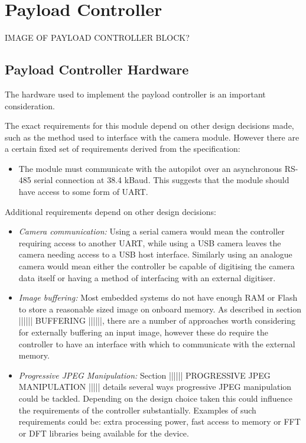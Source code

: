 \section{Payload Controller}
IMAGE OF PAYLOAD CONTROLLER BLOCK?

\subsection{Payload Controller Hardware}
The hardware used to implement the payload controller is an important consideration.

The exact requirements for this module depend on other design decisions made, such as the method used to interface with the camera module. However there are a certain fixed set of requirements derived from the specification:

\begin{itemize}
\item The module must communicate with the autopilot over an asynchronous RS-485 serial connection at 38.4 kBaud. This suggests that the module should have access to some form of UART.
\end{itemize}

Additional requirements depend on other design decisions:

\begin{itemize}
\item \emph{Camera communication:} Using a serial camera would mean the controller requiring access to another UART, while using a USB camera leaves the camera needing access to a USB host interface. Similarly using an analogue camera would mean either the controller be capable of digitising the camera data itself or having a method of interfacing with an external digitiser.
 
\item \emph{Image buffering:} Most embedded systems do not have enough RAM or Flash to store a reasonable sized image on onboard memory. As described in section |||||| BUFFERING ||||||, there are a number of approaches worth considering for externally buffering an input image, however these do require the controller to have an interface with which to communicate with the external memory. 

\item \emph{Progressive JPEG Manipulation:} Section |||||| PROGRESSIVE JPEG MANIPULATION ||||| details several ways progressive JPEG manipulation could be tackled. Depending on the design choice taken this could influence the requirements of the controller substantially. Examples of such requirements could be: extra processing power, fast access to memory or FFT or DFT libraries being available for the device.
\end{itemize}

